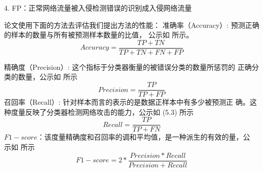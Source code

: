 4. FP：正常网络流量被入侵检测错误的识别成入侵网络流量

论文使用下面的方法去评估我们提出方法的性能：
准确率（Accuracy）: 预测正确的样本的数量与所有被预测样本数量的比值，
公示如 所示。
\begin{equation}
    Accuracy = \frac{TP + TN}{TP + TN + FN + FP}
\end{equation}

精确度（Precision）: 这个指标于分类器衡量的被错误分类的数量所惩罚的
正确分类的数量，公示如 所示
\begin{equation}
    Precision = \frac{TP}{TP + FP}
\end{equation}
召回率（Recall）: 针对样本而言的表示的是数据正样本中有多少被预测正
确。这种度量反映了分类器检测网络攻击的能力，公示如 (5.3) 所示
\begin{equation}
    Recall = \frac{TP}{TP+ FN}
\end{equation}
$F1-score$：该度量精确度和召回率的调和平均值，是一种派生的有效的量，公
示如  所示
\begin{equation}
    F1-score = 2*\frac{Precision * Recall}{Precision + Recall}
\end{equation}
